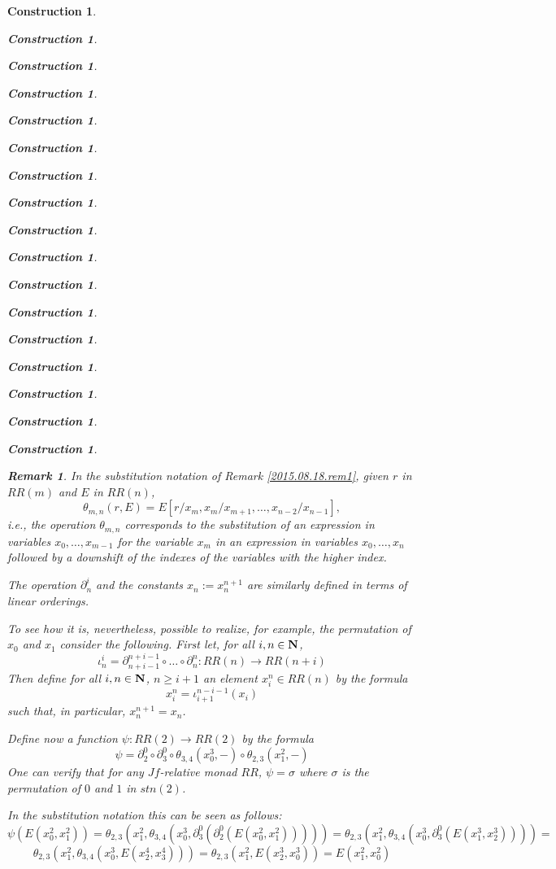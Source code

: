 \documentclass[12pt]{amsart}
\newtheorem{remark}[proposition]{Remark}
\newtheorem{construction}[proposition]{Construction}
\newcommand{\sr}{\rightarrow}
\newcommand{\nn}{{\bf N\rm}}
\newcommand{\nat}{\nn}
\begin{document}
\begin{construction}
\begin{construction}
\begin{construction}
\begin{construction}
\begin{construction}
\begin{construction}
\begin{construction}
\begin{construction}
\begin{construction}
\begin{construction}
\begin{construction}
\begin{construction}
\begin{construction}
\begin{construction}
\begin{construction}
\begin{construction}
\begin{construction}
\begin{remark}
In the substitution notation of Remark \ref{2015.08.18.rem1}, given $r$ in $RR(m)$ and $E$ in $RR(n)$, 
%
$$\theta_{m,n}(r,E)=E[r/x_m,x_m/x_{m+1},\dots,x_{n-2}/x_{n-1}],$$
%
i.e., the operation $\theta_{m,n}$ corresponds to the substitution of an expression in variables $x_0,\dots,x_{m-1}$ for the variable $x_m$ in an expression in variables $x_0,\dots,x_n$ followed by a downshift of the indexes of the variables with the higher index. 

The operation $\partial_n^i$ and the constants $x_n:=x^{n+1}_{n}$ are similarly defined in terms of linear orderings.

To see how it is, nevertheless, possible to realize, for example, the permutation of $x_0$ and $x_1$ consider the following. First let, for all $i,n\in\nat$, 
%
$$\iota_n^i=\partial_{n+i-1}^{n+i-1}\circ \dots\circ \partial_n^n:RR(n)\sr RR(n+i)$$
%
Then define for all $i,n\in\nat$, $n\ge i+1$ an element $x^n_i\in RR(n)$ by the formula
%
$$x^n_i=\iota_{i+1}^{n-i-1}(x_i)$$
%
such that, in particular, $x^{n+1}_{n}=x_n$.

Define now a function $\psi:RR(2)\sr RR(2)$ by the formula
%
$$\psi=\partial^0_2\circ \partial^0_3\circ \theta_{3,4}(x_0^3,-)\circ \theta_{2,3}(x_1^2,-)$$
%
One can verify that for any $Jf$-relative monad $RR$, $\psi=\sigma$ where $\sigma$ is the permutation of $0$ and $1$ in $stn(2)$. 

In the substitution notation this can be seen as follows:
%
$$\psi(E(x^2_0,x_1^2))=\theta_{2,3}(x_1^2,\theta_{3,4}(x_0^3,\partial^0_3(\partial^0_2(E(x^2_0,x_1^2)))))=\theta_{2,3}(x_1^2,\theta_{3,4}(x_0^3,\partial^0_3(E(x^3_1,x^3_2))))=$$
$$\theta_{2,3}(x_1^2,\theta_{3,4}(x_0^3,E(x^4_2,x^4_3)))=\theta_{2,3}(x_1^2,E(x^3_2,x^3_0))=E(x^2_1,x^2_0)$$
%
\end{remark}
%


































\end{construction}
\end{construction}
\end{construction}
\end{construction}
\end{construction}
\end{construction}
\end{construction}
\end{construction}
\end{construction}
\end{construction}
\end{construction}
\end{construction}
\end{construction}
\end{construction}
\end{construction}
\end{construction}
\end{construction}
\end{document}
